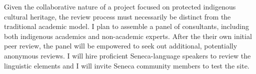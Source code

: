\documentclass{neh}
\begin{document}
Given the collaborative nature of a project focused on protected indigenous
cultural heritage, the review process must necessarily be distinct from the
traditional academic model.
I plan to assemble a panel of consultants, including both indigenous academics
and non-academic experts.
After the their own initial peer review, the panel will be empowered to seek
out additional, potentially anonymous reviews.
I will hire proficient Seneca-language speakers to review the linguistic
elements and I will invite Seneca community members to test the site.
\end{document}
